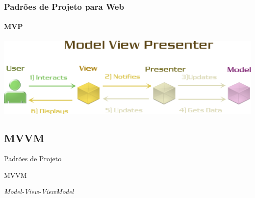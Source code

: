 \documentclass[
	9pt, %
	t, %
]{beamer}
\begin{document}

\begin{frame}
	\frametitle{Padrões de Projeto para Web}
	\framesubtitle{MVP}
	\vfill

	\centering
	\includegraphics[width=0.9\linewidth]{Images/mvp2.png}

\end{frame}


\subsection{MVVM}

\begin{frame}
	\begin{center}

		\bigskip\bigskip\bigskip\bigskip %
		{\Large Padrões de Projeto}

		\bigskip\bigskip %
		{\Huge MVVM}

		\smallskip
		{\small \textit{Model-View-ViewModel}}
	\end{center}

\end{frame}


\end{document}

